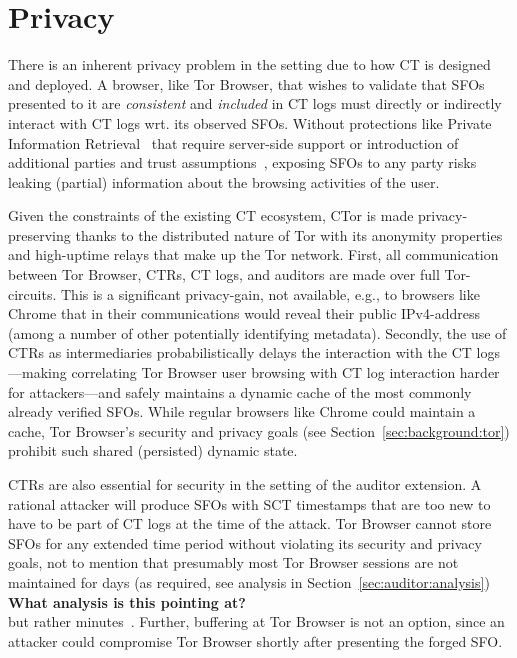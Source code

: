 \section{Privacy} \label{sec:privacy}
There is an inherent privacy problem in the setting due to how CT is designed
and deployed. A browser, like Tor Browser, that wishes to validate that SFOs presented to
it are \emph{consistent} and \emph{included} in CT logs must directly or
indirectly interact with CT logs wrt. its observed SFOs. Without protections
like Private Information Retrieval~\cite{PIR} that require server-side support
or introduction of additional parties and trust
assumptions~\cite{lueks-and-goldberg,kales}, exposing SFOs to any party risks
leaking (partial) information about the browsing activities of the user.

Given the constraints of the existing CT ecosystem, CTor is made
privacy-preserving thanks to the distributed nature of Tor with its anonymity
properties and high-uptime relays that make up the Tor network. First, all
communication between Tor Browser, CTRs, CT logs, and auditors are made over full
Tor-circuits. This is a significant privacy-gain, not available, e.g., to
browsers like Chrome that in their communications would reveal their public
IPv4-address (among a number of other potentially identifying metadata).
Secondly, the use of CTRs as intermediaries probabilistically delays the
interaction with the CT logs---making correlating Tor Browser user browsing with CT log
interaction harder for attackers---and safely maintains a dynamic cache of the
most commonly already verified SFOs. While regular browsers like Chrome could
maintain a cache, Tor Browser's security and privacy goals (see
Section~\ref{sec:background:tor}) prohibit such shared (persisted) dynamic
state.

CTRs are also essential for security in the setting of the auditor extension. A
rational attacker will produce SFOs with SCT timestamps that are too new to have
to be part of CT logs at the time of the attack. Tor Browser cannot store SFOs for any
extended time period without violating its security and privacy goals, not to
mention that presumably most Tor Browser sessions are not maintained for
days (as required, see analysis in Section~\ref{sec:auditor:analysis}) 
{\bf \color{red} What analysis is this pointing at?}\\
but rather minutes~\cite{DBLP:conf/pam/AmannS16}. Further, buffering
at Tor Browser is not an option, since an attacker could compromise Tor Browser shortly
after presenting the forged SFO.

